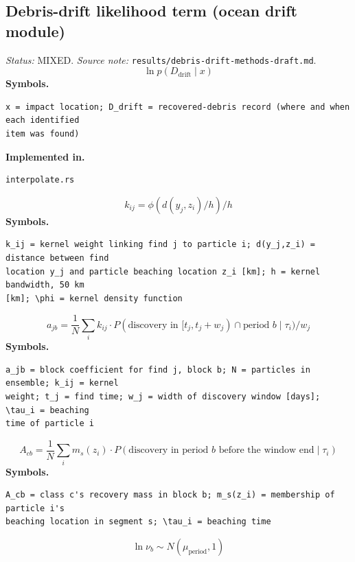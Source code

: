 \documentclass[11pt,a4paper]{article}
\begin{document}
\subsection{Debris-drift likelihood term (ocean drift module)}
\noindent\textit{Status:} MIXED. \textit{Source note:} \texttt{results/debris-drift-methods-draft.md}.
\medskip
\begin{equation}
\ln p(D_{\text{drift}} \mid x)
\end{equation}
\noindent\textbf{Symbols.}
\begin{verbatim}
x = impact location; D_drift = recovered-debris record (where and when each identified
item was found)
\end{verbatim}
\noindent\textbf{Implemented in.}
\begin{verbatim}
interpolate.rs
\end{verbatim}
\medskip
\begin{equation}
k_{ij} = \phi(d(y_j, z_i)/h)/h
\end{equation}
\noindent\textbf{Symbols.}
\begin{verbatim}
k_ij = kernel weight linking find j to particle i; d(y_j,z_i) = distance between find
location y_j and particle beaching location z_i [km]; h = kernel bandwidth, 50 km
[km]; \phi = kernel density function
\end{verbatim}
\medskip
\begin{equation}
a_{jb} = \frac{1}{N} \sum_i k_{ij} \cdot P(\text{discovery in } [t_j, t_j+w_j) \cap \text{period } b \mid \tau_i) / w_j
\end{equation}
\noindent\textbf{Symbols.}
\begin{verbatim}
a_jb = block coefficient for find j, block b; N = particles in ensemble; k_ij = kernel
weight; t_j = find time; w_j = width of discovery window [days]; \tau_i = beaching
time of particle i
\end{verbatim}
\medskip
\begin{equation}
A_{cb} = \frac{1}{N} \sum_i m_s(z_i) \cdot P(\text{discovery in period } b \text{ before the window end} \mid \tau_i)
\end{equation}
\noindent\textbf{Symbols.}
\begin{verbatim}
A_cb = class c's recovery mass in block b; m_s(z_i) = membership of particle i's
beaching location in segment s; \tau_i = beaching time
\end{verbatim}
\medskip
\begin{equation}
\ln \nu_b \sim N(\mu_{\text{period}}, 1)
\end{equation}
\end{document}
